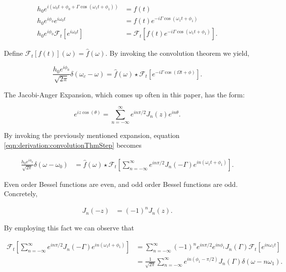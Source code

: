 \documentclass[onecolumn, groupedaddress, 10pt]{revtex4-1}
\begin{document}
\begin{align}
h_0 e^{i\left( \omega_0 t + \phi_0 + \Gamma \cos (\omega_1 t + \phi_1 ) \right)} &= f(t) 												\\
h_0 e^{i\phi_0} e^{i\omega_0 t} &= f(t) e^{-i\Gamma \cos (\omega_1 t + \phi_1)}															\\
h_0 e^{i\phi_0} \mathcal{F}_t \left[ e^{i\omega_0 t} \right] &= \mathcal{F}_t \left[ f(t) e^{-i\Gamma \cos (\omega_1 t + \phi_1)} \right].
\end{align}

Define $\mathcal{F}_t[f(t)](\omega) = \hat{f}(\omega)$. By invoking the convolution theorem we yield,

\begin{equation}
\label{eqn:derivation:convolutionThmStep}
\frac{h_0 e^{i\phi_0}}{\sqrt{2\pi}} \delta (\omega_c - \omega) = \hat{f}(\omega) \star \mathcal{F}_t \left[ e^{-i\Gamma \cos (\Omega t + \phi)} \right].
\end{equation}

The Jacobi-Anger Expansion, which comes up often in this paper, has the form:

\begin{equation}
\label{eqn:jacobiAnger}
e^{iz\cos (\theta)} = \sum_{n=-\infty}^{\infty} e^{in\pi/2} J_n(z) e^{in\theta}.
\end{equation}

By invoking the previously mentioned expansion, equation \ref{eqn:derivation:convolutionThmStep} becomes

\begin{align}
\label{eqn:derivation:jacobiAngerInsertion}
\frac{h_0 e^{i\phi_0}}{\sqrt{2\pi}} \delta (\omega - \omega_0)
&=
\hat{f}(\omega)
\star \mathcal{F}_t \left[ \sum_{n=-\infty}^{\infty} e^{in\pi/2} J_n(-\Gamma) e^{in(\omega_1 t + \phi_1)} \right].
\end{align}

Even order Bessel functions are even, and odd order Bessel functions are odd. Concretely,

\begin{align}
	J_n(-z) &= (-1)^n J_n(z).
\end{align}

By employing this fact we can observe that

\begin{align}
\mathcal{F}_t \left[ \sum_{n=-\infty}^{\infty} e^{in\pi/2} J_n(-\Gamma) e^{in(\omega_1 t + \phi_1)} \right]
&= \sum_{n=-\infty}^{\infty} (-1)^n e^{in\pi/2} e^{in\phi_1} J_n(\Gamma) \mathcal{F}_t \left[e^{in\omega_1 t} \right]	 \\
&= \frac{1}{\sqrt{2\pi}}\sum_{n=-\infty}^{\infty} e^{in(\phi_1 - \pi/2)} J_n(\Gamma) \delta (\omega - n\omega_1).
\end{align}
\end{document}
